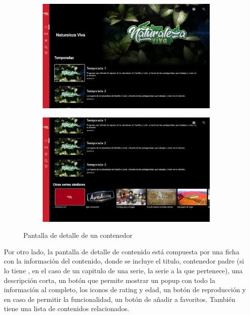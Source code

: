 \begin{figure}[H]
    \begin{subfigure}[c]{0.5\textwidth}
        \includegraphics[width=\textwidth]{imaxes/OTT/pantalla_detalle_contenedor1.png}
        \label{fig:Widget_banner}
    \end{subfigure}
    \hspace{0.1\textwidth}
    \begin{subfigure}[c]{0.5\textwidth}
        \includegraphics[width=\textwidth]{imaxes/OTT/pantalla_detalle_contenedor2.png}
        \label{fig:Widget_mosaico}
    \end{subfigure}
    \caption{Pantalla de detalle de un contenedor}
\end{figure}

Por otro lado, la pantalla de detalle de contenido está compuesta por una ficha con la información del contenido, donde se incluye el titulo, contenedor padre (si lo
tiene , en el caso de un capitulo de una serie, la serie a la que pertenece), una descripción corta, un botón que permite mostrar un popup con todo la información al 
completo, los iconos de rating y edad, un botón de reproducción y en caso de permitir la funcionalidad, un botón de añadir a favoritos. También tiene una lista de
contenidos relacionados.

